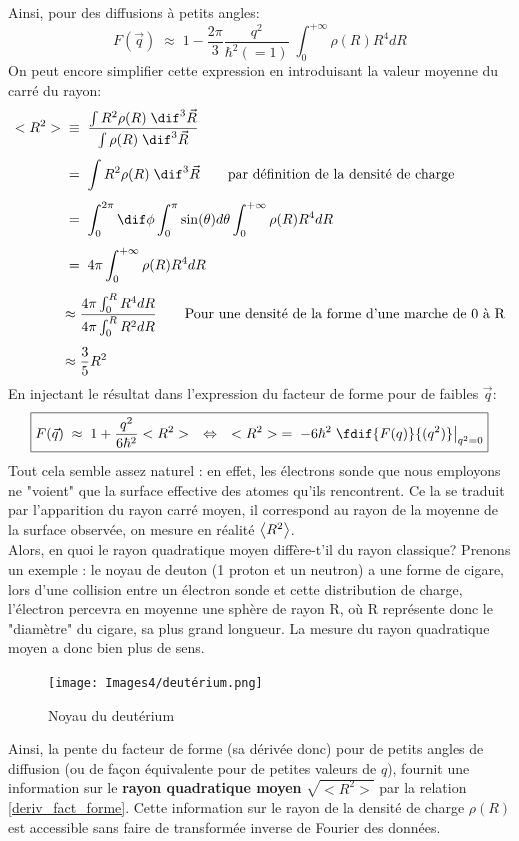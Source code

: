 Ainsi, pour des diffusions à petits angles:
\[
    F(\vec{q}) \;\approx\; 1 - \dfrac{2\pi}{3}\dfrac{q^2}{\hbar^2(=1)} \;\int_0^{+\infty}\rho(R) R^4 dR
\]
On peut encore simplifier cette expression en introduisant la valeur moyenne du carré du rayon:
\begin{align*}
    <R^2> &\;\equiv\;
    \dfrac{ \int R^2 \rho(R) \; \dif^3\vec{R} }{ \int \rho(R) \; \dif^3\vec{R} }\\[4pt]
    &\eq
    \int R^2 \rho(R) \; \dif^3\vec{R}
    \qquad \text{par définition de la densité de charge}\\[4pt]
    &\eq
    \int_0^{2\pi}\dif\phi \int_0^{\pi} \sin(\theta) d\theta \int_0^{+\infty}\rho(R) R^4dR\\[4pt]
    &\eq 
    4\pi \int_0^{+\infty}\rho(R) R^4dR\\[4pt]
    &\approx \dfrac{4\pi\int_0^R R^4dR}{4\pi\int_0^R R^2dR} \qquad \text{Pour une densité de la forme d'une marche de 0 à R}\\[4pt]
    &\approx \dfrac{3}{5}R^2
\end{align*}
En injectant le résultat dans l'expression du facteur de forme pour de faibles $\vec{q}$:
\begin{equation}
    \boxed{
    F(\vec{q}) \;\approx\; 1 + \dfrac{q^2}{6\hbar^2} <R^2>
    \quad \Leftrightarrow \quad
    <R^2> \eq -6\hbar^2 \left. \fdif{F(q)}{(q^2)}\right|_{q^2=0}
    }
    \label{deriv_fact_forme}
\end{equation}
Tout cela semble assez naturel :  en effet, les électrons sonde que nous employons ne "voient" que la surface effective des atomes qu'ils rencontrent. Ce la se traduit par l'apparition du rayon carré moyen, il correspond au rayon de la moyenne de la surface observée, on mesure en réalité $\expval{R^2}$.\\
Alors, en quoi le rayon quadratique moyen diffère-t'il du rayon classique? Prenons un exemple : le noyau de deuton (1 proton et un neutron) a une forme de cigare, lors d'une collision entre un électron sonde et cette distribution de charge, l'électron percevra en moyenne une sphère de rayon R, où R représente donc le "diamètre" du cigare, sa plus grand longueur. La mesure du rayon quadratique moyen a donc bien plus de sens.\\
\begin{figure}[H]
    \centering
    \texttt{[image: Images4/deutérium.png]}
    \caption{Noyau du deutérium}
\end{figure}
Ainsi, la pente du facteur de forme (sa dérivée donc) pour de petits angles de diffusion (ou de façon équivalente pour de petites valeurs de $q$), fournit une information sur le \textbf{rayon quadratique moyen} $\sqrt{<R^2>}$ par la relation \ref{deriv_fact_forme}. Cette information sur le rayon de la densité de charge $\rho(R)$ est accessible sans faire de transformée inverse de Fourier des données.\\
